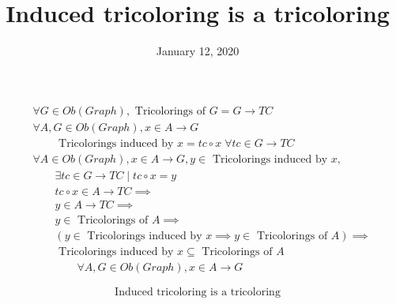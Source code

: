 \documentclass[fleqn, 11pt]{article}
\date{January 12, 2020}
\title{Induced tricoloring is a tricoloring}
\begin{document}

\begin{equation*}
\begin{aligned}
& \forall G \in Ob(Graph), \text{ Tricolorings of } G = G \rightarrow TC \\
& \forall A, G \in Ob(Graph), x \in A \rightarrow G \\
& \qquad \text{ Tricolorings induced by } x = tc \circ x \; 
    \forall tc \in G \rightarrow TC \\
& \forall A \in Ob(Graph), x \in A \rightarrow G, 
  y \in \text{ Tricolorings induced by } x, \\
& \qquad \exists tc \in G \rightarrow TC \mid tc \circ x = y \\
& \qquad tc \circ x \in A \rightarrow TC \implies \\
& \qquad y \in A \rightarrow TC \implies \\
& \qquad y \in \text{ Tricolorings of } A \implies \\
& \qquad (y \in \text{ Tricolorings induced by } x \implies
  y \in \text{ Tricolorings of } A) \implies \\
& \qquad \text{ Tricolorings induced by } x \subseteq
  \text{ Tricolorings of } A \\
& \qquad \qquad \forall A, G \in Ob(Graph), x \in A \rightarrow G
\end{aligned}
\end{equation*}

\hrulefill

$$ \text{ Induced tricoloring is a tricoloring } $$
\end{document}
